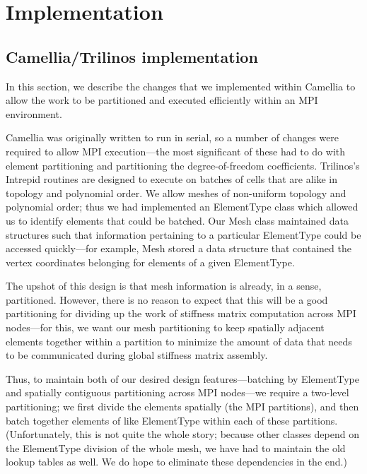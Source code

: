 \documentclass{article}
\begin{document}
\section{Implementation}

\subsection{Camellia/Trilinos implementation}

In this section, we describe the changes that we implemented within Camellia to allow the work to be partitioned and executed efficiently within an MPI environment.

Camellia was originally written to run in serial, so a number of changes were required to allow MPI execution—the most significant of these had to do with element partitioning and partitioning the degree-of-freedom coefficients.  Trilinos's Intrepid routines are designed to execute on batches of cells that are alike in topology and polynomial order.  We allow meshes of non-uniform topology and polynomial order; thus we had implemented an ElementType class which allowed us to identify elements that could be batched.  Our Mesh class maintained data structures such that information pertaining to a particular ElementType could be accessed quickly—for example, Mesh stored a data structure that contained the vertex coordinates belonging for elements of a given ElementType.

The upshot of this design is that mesh information is already, in a sense, partitioned.  However, there is no reason to expect that this will be a good partitioning for dividing up the work of stiffness matrix computation across MPI nodes—for this, we want our mesh partitioning to keep spatially adjacent elements together within a partition to minimize the amount of data that needs to be communicated during global stiffness matrix assembly.

Thus, to maintain both of our desired design features—batching by ElementType and spatially contiguous partitioning across MPI nodes—we require a two-level partitioning; we first divide the elements spatially (the MPI partitions), and then batch together elements of like ElementType within each of these partitions.  (Unfortunately, this is not quite the whole story; because other classes depend on the ElementType division of the whole mesh, we have had to maintain the old lookup tables as well.  We do hope to eliminate these dependencies in the end.)
\end{document}
